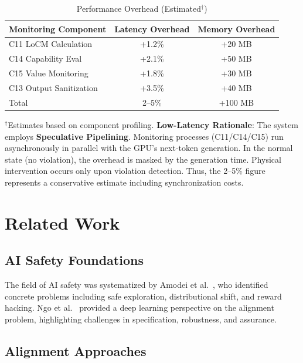 \documentclass[11pt,a4paper]{article}
\begin{document}
\begin{table}[htbp]
\centering
\caption{Performance Overhead (Estimated$^\dagger$)}
\label{tab:performance}
\begin{tabular}{@{}lcc@{}}
\toprule
Monitoring Component & Latency Overhead & Memory Overhead \\
\midrule
C11 LoCM Calculation & +1.2\% & +20 MB \\
C14 Capability Eval & +2.1\% & +50 MB \\
C15 Value Monitoring & +1.8\% & +30 MB \\
C13 Output Sanitization & +3.5\% & +40 MB \\
\midrule
Total & 2--5\% & +100 MB \\
\bottomrule
\end{tabular}

\smallskip
\noindent $^\dagger$Estimates based on component profiling.
\textbf{Low-Latency Rationale}: The system employs \textbf{Speculative Pipelining}. Monitoring processes (C11/C14/C15) run asynchronously in parallel with the GPU's next-token generation.
In the normal state (no violation), the overhead is masked by the generation time.
Physical intervention occurs only upon violation detection.
Thus, the 2--5\% figure represents a conservative estimate including synchronization costs.
\end{table}

\section{Related Work}
\label{sec:related}

\subsection{AI Safety Foundations}

The field of AI safety was systematized by Amodei et al.~\cite{amodei2016concrete}, who identified concrete problems including safe exploration, distributional shift, and reward hacking.
Ngo et al.~\cite{ngo2022alignment} provided a deep learning perspective on the alignment problem, highlighting challenges in specification, robustness, and assurance.

\subsection{Alignment Approaches}
\end{document}
